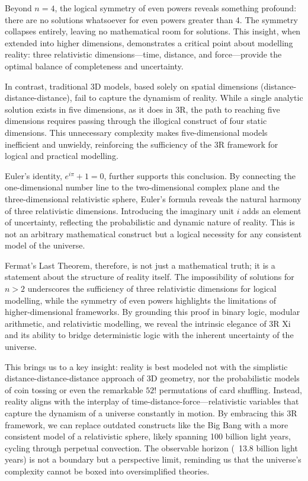 \documentclass[12pt]{article}
\begin{document}
Beyond \(n = 4\), the logical symmetry of even powers reveals something profound: there are no solutions whatsoever for even powers greater than 4. The symmetry collapses entirely, leaving no mathematical room for solutions. This insight, when extended into higher dimensions, demonstrates a critical point about modelling reality: three relativistic dimensions—time, distance, and force—provide the optimal balance of completeness and uncertainty.

In contrast, traditional 3D models, based solely on spatial dimensions (distance-distance-distance), fail to capture the dynamism of reality. While a single analytic solution exists in five dimensions, as it does in 3R, the path to reaching five dimensions requires passing through the illogical construct of four static dimensions. This unnecessary complexity makes five-dimensional models inefficient and unwieldy, reinforcing the sufficiency of the 3R framework for logical and practical modelling.

Euler’s identity, \(e^{i\pi} + 1 = 0\), further supports this conclusion. By connecting the one-dimensional number line to the two-dimensional complex plane and the three-dimensional relativistic sphere, Euler’s formula reveals the natural harmony of three relativistic dimensions. Introducing the imaginary unit \(i\) adds an element of uncertainty, reflecting the probabilistic and dynamic nature of reality. This is not an arbitrary mathematical construct but a logical necessity for any consistent model of the universe.

Fermat’s Last Theorem, therefore, is not just a mathematical truth; it is a statement about the structure of reality itself. The impossibility of solutions for \(n > 2\) underscores the sufficiency of three relativistic dimensions for logical modelling, while the symmetry of even powers highlights the limitations of higher-dimensional frameworks. By grounding this proof in binary logic, modular arithmetic, and relativistic modelling, we reveal the intrinsic elegance of 3R Xi and its ability to bridge deterministic logic with the inherent uncertainty of the universe.

This brings us to a key insight: reality is best modeled not with the simplistic distance-distance-distance approach of 3D geometry, nor the probabilistic models of coin tossing or even the remarkable \(52!\) permutations of card shuffling. Instead, reality aligns with the interplay of time-distance-force—relativistic variables that capture the dynamism of a universe constantly in motion. By embracing this 3R framework, we can replace outdated constructs like the Big Bang with a more consistent model of a relativistic sphere, likely spanning 100 billion light years, cycling through perpetual convection. The observable horizon (~13.8 billion light years) is not a boundary but a perspective limit, reminding us that the universe’s complexity cannot be boxed into oversimplified theories.
\end{document}
